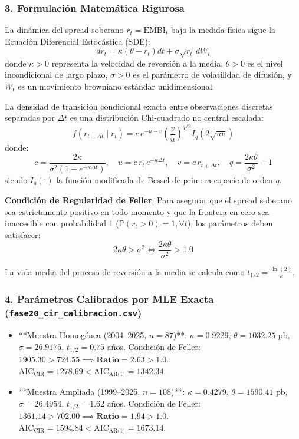 \documentclass[11pt,a4paper]{article}
\begin{document}
\subsubsection{3. Formulación Matemática Rigurosa}
La dinámica del spread soberano $r_t = \text{EMBI}_t$ bajo la medida física sigue la Ecuación Diferencial Estocástica (SDE):
\begin{equation}
dr_t = \kappa (\theta - r_t) dt + \sigma \sqrt{r_t} \, dW_t
\end{equation}
donde $\kappa > 0$ representa la velocidad de reversión a la media, $\theta > 0$ es el nivel incondicional de largo plazo, $\sigma > 0$ es el parámetro de volatilidad de difusión, y $W_t$ es un movimiento browniano estándar unidimensional.

La densidad de transición condicional exacta entre observaciones discretas separadas por $\Delta t$ es una distribución Chi-cuadrado no central escalada:
\begin{equation}
f(r_{t+\Delta t} \mid r_t) = c \, e^{-u - v} \left( \frac{v}{u} \right)^{q/2} I_q(2 \sqrt{uv})
\end{equation}
donde:
\begin{equation}
c = \frac{2\kappa}{\sigma^2 (1 - e^{-\kappa \Delta t})}, \quad u = c \, r_t \, e^{-\kappa \Delta t}, \quad v = c \, r_{t+\Delta t}, \quad q = \frac{2\kappa\theta}{\sigma^2} - 1
\end{equation}
siendo $I_q(\cdot)$ la función modificada de Bessel de primera especie de orden $q$.

\textbf{Condición de Regularidad de Feller}: Para asegurar que el spread soberano sea estrictamente positivo en todo momento y que la frontera en cero sea inaccesible con probabilidad 1 ($\mathbb{P}(r_t > 0) = 1, \forall t$), los parámetros deben satisfacer:
\begin{equation}
2\kappa\theta > \sigma^2 \iff \frac{2\kappa\theta}{\sigma^2} > 1.0
\end{equation}

La vida media del proceso de reversión a la media se calcula como $t_{1/2} = \frac{\ln(2)}{\kappa}$.

\subsubsection{4. Parámetros Calibrados por MLE Exacta (\texttt{fase20\_cir\_calibracion.csv})}
\begin{itemize}
    \item **Muestra Homogénea (2004--2025, $n=87$)**: $\kappa = 0.9229$, $\theta = 1032.25$ pb, $\sigma = 26.9175$, $t_{1/2} = 0.75$ años. Condición de Feller: $1905.30 > 724.55 \implies \mathbf{Ratio = 2.63 > 1.0}$. $\text{AIC}_{\text{CIR}} = 1278.69 < \text{AIC}_{\text{AR(1)}} = 1342.34$.
    \item **Muestra Ampliada (1999--2025, $n=108$)**: $\kappa = 0.4279$, $\theta = 1590.41$ pb, $\sigma = 26.4954$, $t_{1/2} = 1.62$ años. Condición de Feller: $1361.14 > 702.00 \implies \mathbf{Ratio = 1.94 > 1.0}$. $\text{AIC}_{\text{CIR}} = 1594.84 < \text{AIC}_{\text{AR(1)}} = 1673.14$.
\end{itemize}
\end{document}
